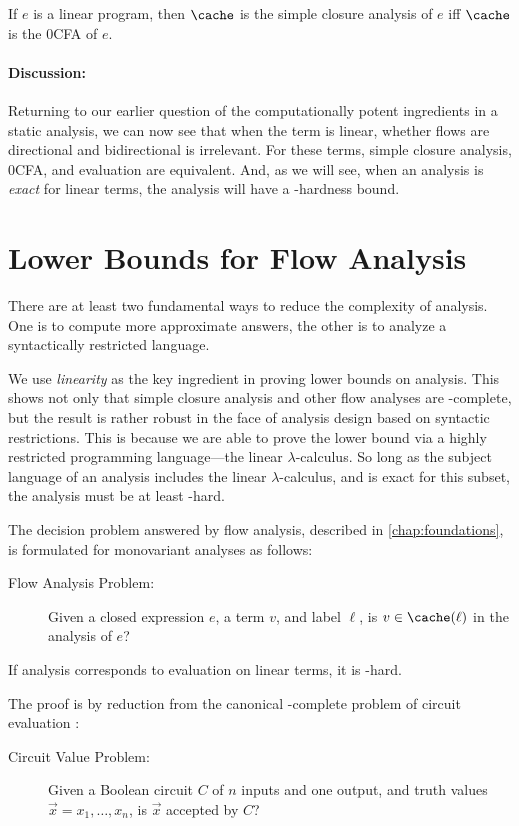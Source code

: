 \begin{corollary}
If $e$ is a linear program, then $\cache$ is the simple closure
analysis of $e$ iff $\cache$ is the 0CFA of $e$.
\end{corollary}

\paragraph{Discussion:}

Returning to our earlier question of the computationally potent
ingredients in a static analysis, we can now see that when the term is
linear, whether flows are directional and bidirectional is irrelevant.
For these terms, simple closure analysis, 0CFA, and evaluation are
equivalent.  And, as we will see, when an analysis is {\em exact} for
linear terms, the analysis will have a \ptime-hardness bound.



\section{Lower Bounds for Flow Analysis}
\label{sec:circuits}


There are at least two fundamental ways to reduce the complexity of
analysis.  One is to compute more approximate answers, the other is to
analyze a syntactically restricted language.

We use {\em linearity} as the key ingredient in proving lower bounds
on analysis.  This shows not only that simple closure analysis and
other flow analyses are \ptime-complete, but the result is rather
robust in the face of analysis design based on syntactic restrictions.
This is because we are able to prove the lower bound via a highly
restricted programming language---the linear $\lambda$-calculus.  So
long as the subject language of an analysis includes the linear
$\lambda$-calculus, and is exact for this subset, the analysis must be
at least \ptime-hard.

The decision problem answered by flow analysis, described in
\autoref{chap:foundations}, is formulated for monovariant analyses as
follows:
\begin{description}
\item[Flow Analysis Problem:] Given a closed expression $e$, a term
$v$, and label $\ell$, is $v \in \cache(\ell)$ in the analysis of $e$?
\end{description}

\begin{theorem}
If analysis corresponds to evaluation on linear terms, it is
\ptime-hard.
\end{theorem}
The proof is by reduction from the canonical \ptime-complete problem
of circuit evaluation \cite{ladner-75}:
\begin{description}
\item[Circuit Value Problem:] Given a Boolean circuit $C$ of $n$
inputs and one output, and truth values $\vec{x} = x_1,\dots,x_n$, is
$\vec{x}$ accepted by $C$?
\end{description}

